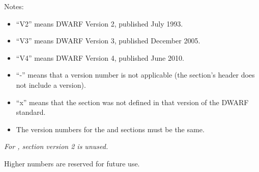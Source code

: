 Notes:

\begin{itemize}
\item  ``V2'' means DWARF Version 2, published July 1993.
\item  ``V3'' means DWARF Version 3, published December 2005.
\item  ``V4'' means DWARF Version 4, published June 2010.
\item  ``-'' means that a version number is not applicable
(the section's header does not include a version).

\item  ``x'' means that the section was not defined in that
version of the DWARF standard.

\item  The version numbers for the  and 
sections must be the same.

\end{itemize}

\textit{For , section version 2 is unused.}

Higher numbers are reserved for future use.

